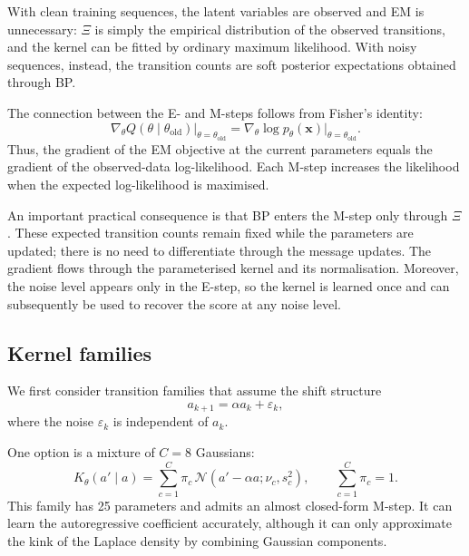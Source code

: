 \documentclass{article}
\begin{document}
With clean training sequences, the latent variables are
observed and EM is unnecessary: $\Xi$ is simply the
empirical distribution of the observed transitions, and
the kernel can be fitted by ordinary maximum likelihood.
With noisy sequences, instead, the transition counts are
soft posterior expectations obtained through BP.

The connection between the E- and M-steps follows from
Fisher's identity:
\begin{equation}
    \left.
    \nabla_\theta Q(\theta\mid\theta_{\mathrm{old}})
    \right|_{\theta=\theta_{\mathrm{old}}}
    =
    \nabla_\theta
    \log p_\theta(\mathbf{x})
    \big|_{\theta=\theta_{\mathrm{old}}}.
\end{equation}
Thus, the gradient of the EM objective at the current
parameters equals the gradient of the observed-data
log-likelihood. Each M-step increases the likelihood
when the expected log-likelihood is maximised.

An important practical consequence is that BP enters
the M-step only through $\Xi$. These expected transition
counts remain fixed while the parameters are updated;
there is no need to differentiate through the message
updates. The gradient flows through the parameterised
kernel and its normalisation. Moreover, the noise level
appears only in the E-step, so the kernel is learned once
and can subsequently be used to recover the score at
any noise level.

\subsection{Kernel families}
\label{sec:kernel-families}

We first consider transition families that assume the
shift structure
\begin{equation}
    a_{k+1}=\alpha a_k+\varepsilon_k,
\end{equation}
where the noise $\varepsilon_k$ is independent of
$a_k$.

One option is a mixture of $C=8$ Gaussians:
\begin{equation}
    K_\theta(a'\mid a)
    =
    \sum_{c=1}^{C}
    \pi_c\,
    \mathcal{N}
    \left(
        a'-\alpha a;\nu_c,s_c^2
    \right),
    \qquad
    \sum_{c=1}^{C}\pi_c=1.
\end{equation}
This family has 25 parameters and admits an almost
closed-form M-step. It can learn the autoregressive
coefficient accurately, although it can only approximate
the kink of the Laplace density by combining Gaussian
components.
\end{document}
